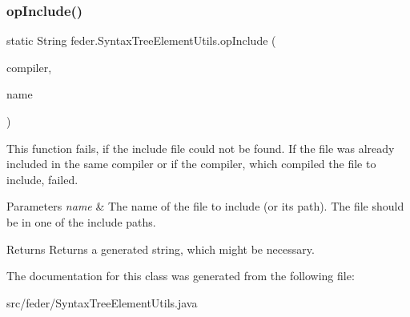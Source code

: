 \subsubsection{\texorpdfstring{op\+Include()}{opInclude()}}
{\footnotesize\ttfamily static String feder.\+Syntax\+Tree\+Element\+Utils.\+op\+Include (\begin{DoxyParamCaption}\item[{\hyperlink{classfeder_1_1FederCompiler}{Feder\+Compiler}}]{compiler,  }\item[{String}]{name }\end{DoxyParamCaption})\hspace{0.3cm}{\ttfamily [static]}}

This function fails, if the include file could not be found. If the file was already included in the same compiler or if the compiler, which compiled the file to include, failed. 
\begin{DoxyParams}{Parameters}
{\em name} & The name of the file to include (or its path). The file should be in one of the include paths. \\
\hline
\end{DoxyParams}
\begin{DoxyReturn}{Returns}
Returns a generated string, which might be necessary. 
\end{DoxyReturn}


The documentation for this class was generated from the following file\+:\begin{DoxyCompactItemize}
\item 
src/feder/Syntax\+Tree\+Element\+Utils.\+java\end{DoxyCompactItemize}
